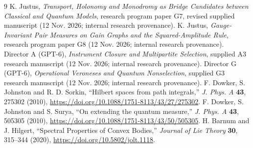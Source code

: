 \documentclass[11pt]{article}
\begin{document}
\begin{thebibliography}{9}\small
{} K. Justus, \emph{Transport, Holonomy and Monodromy as Bridge Candidates between Classical and Quantum Models}, research program paper G7, revised supplied manuscript (12 Nov. 2026; internal research provenance).
 K. Justus, \emph{Gauge-Invariant Pair Measures on Gain Graphs and the Squared-Amplitude Rule}, research program paper G8 (12 Nov. 2026; internal research provenance).
 Director A (GPT-6), \emph{Instrument Closure and Multipartite Selection}, supplied A3 research manuscript (12 Nov. 2026; internal research provenance).
 Director G (GPT-6), \emph{Operational Veroneses and Quantum Nonselection}, supplied G3 research manuscript (12 Nov. 2026; internal research provenance).
 F. Dowker, S. Johnston and R. D. Sorkin, ``Hilbert spaces from path integrals,'' \emph{J. Phys. A} \textbf{43}, 275302 (2010), \url{https://doi.org/10.1088/1751-8113/43/27/275302}.
 F. Dowker, S. Johnston and S. Surya, ``On extending the quantum measure,'' \emph{J. Phys. A} \textbf{43}, 505305 (2010), \url{https://doi.org/10.1088/1751-8113/43/50/505305}.
 H. Barnum and J. Hilgert, ``Spectral Properties of Convex Bodies,'' \emph{Journal of Lie Theory} \textbf{30}, 315--344 (2020), \url{https://doi.org/10.5802/jolt.1118}.
\end{thebibliography}
\end{document}
